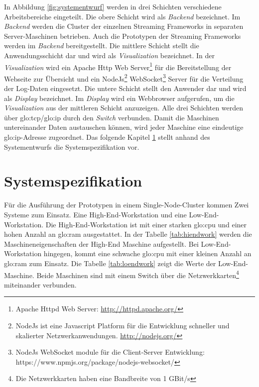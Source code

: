 In Abbildung \ref{fig:systementwurf} werden in drei Schichten verschiedene Arbeitsbereiche eingeteilt. Die obere Schicht wird als \textit{Backend} bezeichnet. Im \textit{Backend} werden die Cluster der einzelnen Streaming Frameworks in separaten Server-Maschinen betrieben. Auch die Prototypen der Streaming Frameworks werden im \textit{Backend} bereitgestellt. Die mittlere Schicht stellt die Anwendungsschicht dar und wird als \textit{Visualization} bezeichnet. In der \textit{Visualization} wird ein Apache Http Web Server\footnote{Apache Httpd Web Server: \url{http://httpd.apache.org/}} für die Bereitstellung der Webseite zur Übersicht und ein NodeJs\footnote{NodeJs ist eine Javascript Platform für die Entwicklung schneller und skalierter Netzwerkanwendungen. \url{http://nodejs.org/}} WebSocket\footnote{NodeJs WebSocket module für die Client-Server Entwicklung: https://www.npmjs.org/package/nodejs-websocket/} Server für die Verteilung der Log-Daten eingesetzt. Die untere Schicht stellt den Anwender dar und wird als \textit{Display} bezeichnet. Im \textit{Display} wird ein Webbrowser aufgerufen, um die \textit{Visualization} aus der mittleren Schicht anzuzeigen. Alle drei Schichten werden über \gls{glo:tcp}/\gls{glo:ip} durch den \textit{Switch} verbunden. Damit die Maschinen untereinander Daten austauschen können, wird jeder Maschine eine eindeutige \gls{glo:ip}-Adresse zugeordnet. Das folgende Kapitel \ref{sec:systemspezifiaktion} stellt anhand des Systementwurfs die Systemspezifikation vor.


\section{Systemspezifikation}
\label{sec:systemspezifiaktion}

Für die Ausführung der Prototypen in einem Single-Node-Cluster kommen Zwei Systeme zum Einsatz. Eine High-End-Workstation und eine Low-End-Workstation. Die High-End-Workstation ist mit einer starken \gls{glo:cpu} und einer hohen Anzahl an \gls{glo:ram} ausgestattet. In der Tabelle \ref{tab:hiendwork} werden die Maschineneigenschaften der High-End Maschine aufgestellt. Bei Low-End-Workstation hingegen, kommt eine schwache \gls{glo:cpu} mit einer kleinen Anzahl an \gls{glo:ram} zum Einsatz. Die Tabelle \ref{tab:loendwork} zeigt die Werte der Low-End-Maschine. Beide Maschinen sind mit einem Switch über die Netzwerkkarten\footnote{Die Netzwerkkarten haben eine Bandbreite von 1 GBit/s} miteinander verbunden. \\

